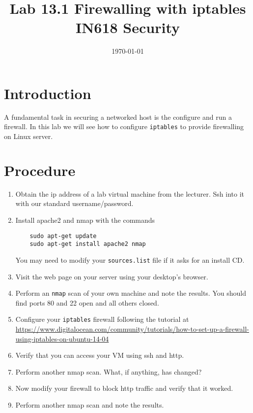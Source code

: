 \documentclass{article}
\begin{document}
\title{ Lab 13.1 Firewalling with iptables\\ IN618 Security}
\date{\today}
\maketitle

\section*{Introduction}
A fundamental task in securing a networked host is the configure and run a firewall.  In this lab we will see how to configure \texttt{iptables} to provide firewalling on  Linux server.

\section*{Procedure}

\begin{enumerate}
	\item Obtain the ip address of a lab virtual machine from the lecturer.  Ssh into it with our standard username/password.
	\item Install apache2 and nmap with the commands \\
	\begin{verbatim}
	sudo apt-get update
	sudo apt-get install apache2 nmap
	\end{verbatim}
	You may need to modify your \texttt{sources.list} file if it asks for an install CD.
	\item Visit the web page on your server using your desktop's browser.
	\item Perform an \texttt{nmap} scan of your own machine and note the results.  You should find ports 80 and 22 open and all others closed.
	\item Configure your \texttt{iptables} firewall following the tutorial at \url{https://www.digitalocean.com/community/tutorials/how-to-set-up-a-firewall-using-iptables-on-ubuntu-14-04}
	\item Verify that you can access your VM using ssh and http.
	\item Perform another nmap scan.  What, if anything, has changed?
	\item Now modify your firewall to block http traffic and verify that it worked.
	\item Perform another nmap scan and note the results.
	
\end{enumerate}
\end{document}
